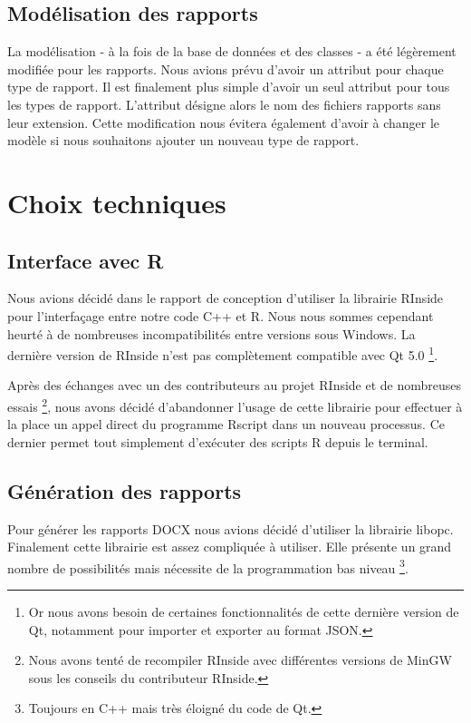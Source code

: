 \documentclass[a4paper,titlepage,french]{report}
\begin{document}
\subsection{Modélisation des rapports}

La modélisation - à la fois de la base de données et des classes - a été légèrement modifiée pour les rapports.
Nous avions prévu d'avoir un attribut pour chaque type de rapport.
Il est finalement plus simple d'avoir un seul attribut pour tous les types de rapport.
L'attribut désigne alors le nom des fichiers rapports sans leur extension.
Cette modification nous évitera également d'avoir à changer le modèle si nous souhaitons ajouter un nouveau type de rapport.


\section{Choix techniques}

\subsection{Interface avec R}

Nous avions décidé dans le rapport de conception d'utiliser la librairie RInside pour l'interfaçage entre notre code C++ et R.
Nous nous sommes cependant heurté à de nombreuses incompatibilités entre versions sous Windows.
La dernière version de RInside n'est pas complètement compatible avec Qt 5.0 \footnote{Or nous avons besoin de certaines fonctionnalités de cette dernière version de Qt, notamment pour importer et exporter au format JSON.}.

Après des échanges avec un des contributeurs au projet RInside et de nombreuses essais \footnote{Nous avons tenté de recompiler RInside avec différentes versions de MinGW sous les conseils du contributeur RInside.}, nous avons décidé d'abandonner l'usage de cette librairie pour effectuer à la place un appel direct du programme Rscript dans un nouveau processus.
Ce dernier permet tout simplement d'exécuter des scripts R depuis le terminal.


\subsection{Génération des rapports}

Pour générer les rapports DOCX nous avions décidé d'utiliser la librairie libopc. %
Finalement cette librairie est assez compliquée à utiliser.
Elle présente un grand nombre de possibilités mais nécessite de la programmation bas niveau \footnote{Toujours en C++ mais très éloigné du code de Qt.}.
\end{document}

